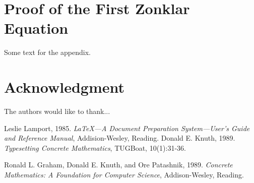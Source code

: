 \documentclass[journal]{IEEEtran}
\begin{document}
\appendices
\section{Proof of the First Zonklar Equation}
Some text for the appendix.

\section*{Acknowledgment}


The authors would like to thank...


\ifCLASSOPTIONcaptionsoff
  \newpage
\fi





%
%
%


\begin{thebibliography}{9}
 Leslie Lamport, 1985. \emph{\LaTeX---A Document
Preparation System---User’s Guide and Reference Manual},
Addision-Wesley, Reading.
 Donald E. Knuth, 1989. \emph{Typesetting Concrete
Mathematics}, TUGBoat, 10(1):31-36.

 Ronald L. Graham, Donald E. Knuth, and Ore
Patashnik, 1989. \emph{Concrete Mathematics: A Foundation for
Computer Science}, Addison-Wesley, Reading.
\end{thebibliography}
% 
\end{document}

